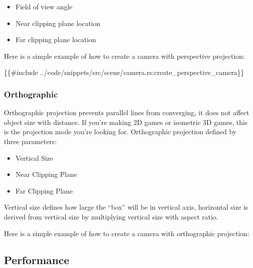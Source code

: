 \documentclass[
]{book}
\newenvironment{Shaded}{\begin{snugshade}}{\end{snugshade}}
\newcommand{\NormalTok}[1]{#1}
\providecommand{\tightlist}{%
  \setlength{\itemsep}{0pt}\setlength{\parskip}{0pt}}
\theoremstyle{definition}
\theoremstyle{definition}
\theoremstyle{definition}
\theoremstyle{definition}
\theoremstyle{remark}
\begin{document}
\begin{itemize}
\tightlist
\item
  Field of view angle
\item
  Near clipping plane location
\item
  Far clipping plane location
\end{itemize}

Here is a simple example of how to create a camera with perspective projection:

\begin{Shaded}
\begin{Highlighting}[]
\NormalTok{\{\{\#include ../code/snippets/src/scene/camera.rs:create\_perspective\_camera\}\}}
\end{Highlighting}
\end{Shaded}

\subsubsection{Orthographic}\label{orthographic}

Orthographic projection prevents parallel lines from converging, it does not affect object size with distance. If you're making 2D games or isometric 3D games, this is the projection mode you're looking for. Orthographic projection defined by three parameters:

\begin{itemize}
\tightlist
\item
  Vertical Size
\item
  Near Clipping Plane
\item
  Far Clipping Plane
\end{itemize}

Vertical size defines how large the ``box'' will be in vertical axis, horizontal size is derived from vertical size by multiplying vertical size with aspect ratio.

Here is a simple example of how to create a camera with orthographic projection:

\begin{Shaded}
\begin{Highlighting}[]

\end{Highlighting}
\end{Shaded}

\subsection{Performance}\label{performance-5}
\end{document}
